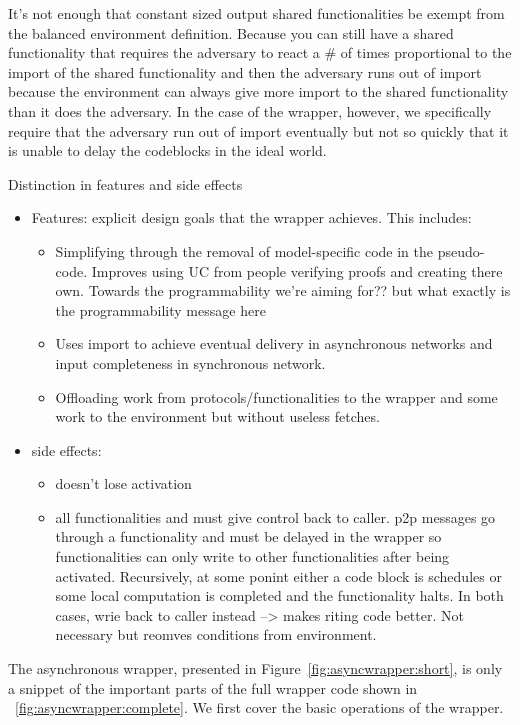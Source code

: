 It’s not enough that constant sized output shared functionalities be exempt from the balanced environment definition. Because you can still have a shared functionality that requires the adversary to react a \# of times proportional to the import of the shared functionality and then the adversary runs out of import because the environment can always give more import to the shared functionality than it does the adversary.
In the case of the wrapper, however, we specifically require that the adversary run out of import eventually but not so quickly that it is unable to delay the codeblocks in the ideal world.



Distinction in features and side effects
\begin{itemize}
\item Features: explicit design goals that the wrapper achieves. This includes:
	\begin{itemize}
	\item Simplifying through the removal of model-specific code in the pseudo-code. Improves using UC from people verifying proofs and creating there own. Towards the programmability we're aiming for?? but what exactly is the programmability message here
	\item Uses import to achieve eventual delivery in asynchronous networks and input completeness in synchronous network.
	\item Offloading work from protocols/functionalities to the wrapper and some work to the environment but without useless fetches.
	\end{itemize}

\item side effects:
	\begin{itemize}
	\item doesn't lose activation
	\item all functionalities and must give control back to caller. p2p messages go through a functionality and must be delayed in the wrapper so functionalities can only write to other functionalities after being activated. Recursively, at some ponint either a code block is schedules or some local computation is completed and the functionality halts. In both cases, wrie back to caller instead --> makes riting code better. Not necessary but reomves conditions from environment.
	\end{itemize}
\end{itemize}



The asynchronous wrapper, presented in Figure~\ref{fig:asyncwrapper:short}, is only a snippet of the important parts of the full wrapper code shown in ~\ref{fig:asyncwrapper:complete}.
We first cover the basic operations of the wrapper.


